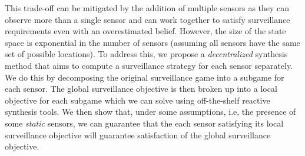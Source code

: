 This trade-off can be mitigated by the addition of multiple sensors as they can observe more than a single sensor and can work together to satisfy surveillance requirements even with an overestimated belief. However, the size of the state space is exponential in the number of sensors (assuming all sensors have the same set of possible locations). To address this, we propose a \emph{decentralized} synthesis method that aims to compute a surveillance strategy for each sensor separately. We do this by decomposing the original surveillance game into a subgame for each sensor. The global surveillance objective is then broken up into a local objective for each subgame which we can solve using off-the-shelf reactive synthesis tools. We then show that, under some assumptions, i.e, the presence of some \emph{static} sensors, we can guarantee that the each sensor satisfying its local surveillance objective will guarantee satisfaction of the global surveillance objective.







